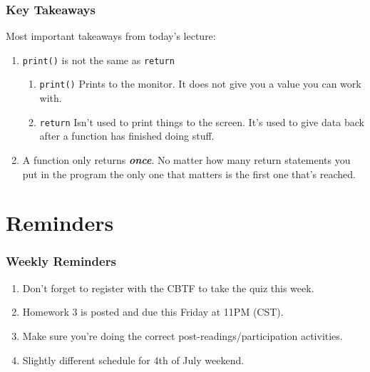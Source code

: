 \documentclass{beamer}
\begin{document}
%
%
\begin{frame}
  \frametitle{Key Takeaways}
  Most important takeaways from today's lecture:
  \begin{enumerate}[A]
    \item \lstinline|print()| is not the same as \lstinline|return|
      \begin{enumerate}[A]
        \item  \lstinline|print()| \textrightarrow Prints to the monitor. It does not give you a value you can work with.
        \item  \lstinline|return| \textrightarrow Isn't used to print things to the screen. It's used to give data back after a function has finished doing stuff.
      \end{enumerate}
    \item A function only returns \textit{\textbf{once}}. No matter how many return statements you put in the program the only one that matters is the first one that's reached.
  \end{enumerate}
\end{frame}

\section{Reminders}
%
%
\begin{frame}
  \frametitle{Weekly Reminders}
  \begin{enumerate}[A]
    \item Don't forget to register with the CBTF to take the quiz this week.
    \item Homework 3 is posted and due this Friday at 11PM (CST).
    \item Make sure you're doing the correct post-readings/participation activities.
    \item Slightly different schedule for 4th of July weekend.
  \end{enumerate}
\end{frame}
\end{document}
